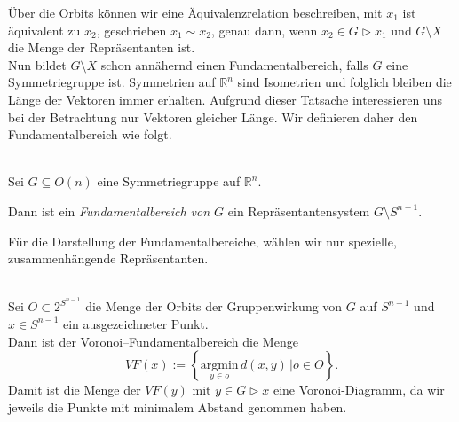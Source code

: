 Über die Orbits können wir eine Äquivalenzrelation beschreiben, mit $x_1$ ist äquivalent zu $x_2$, geschrieben $x_1 \sim x_2$, genau dann, wenn $x_2 \in G \rhd x_1$ und $G \setminus X$ die Menge der Repräsentanten ist.\\

Nun bildet $G \setminus X$ schon annähernd einen Fundamentalbereich, falls $G$ eine Symmetriegruppe ist. Symmetrien auf $\mathbb{R}^n$ sind Isometrien und folglich bleiben die Länge der Vektoren immer erhalten. Aufgrund dieser Tatsache interessieren uns bei der Betrachtung nur Vektoren gleicher Länge. Wir definieren daher den Fundamentalbereich wie folgt.\\

\begin{definition}[Fundamentalbereich]\label{fundamentalbereich:def} \mbox{}\\
   Sei $G \subseteq O(n)$ eine Symmetriegruppe auf $\mathbb{R}^n$.

   \noindent Dann ist ein \emph{Fundamentalbereich von $G$} ein Repräsentantensystem $G \setminus S^{n-1}$.
\end{definition} 

Für die Darstellung der Fundamentalbereiche, wählen wir nur spezielle, zusammenhängende Repräsentanten.

\begin{definition}\label{fundamentalbereich:voronoi} \mbox{}\\
   Sei $O \subset 2^{S^{n-1}}$ die Menge der Orbits der Gruppenwirkung von $G$ auf $S^{n-1}$ und $x \in S^{n-1}$ ein ausgezeichneter Punkt.\\

   Dann ist der Voronoi--Fundamentalbereich die Menge
   $$
      VF(x) := \left\{ \underset{y\in o}{\text{argmin}} \, d(x,y) \, |  o \in O\right\}.
   $$
   Damit ist die Menge der $VF(y)$ mit $y \in G \rhd x$ eine Voronoi-Diagramm, da wir jeweils die Punkte mit minimalem Abstand genommen haben.
\end{definition}


